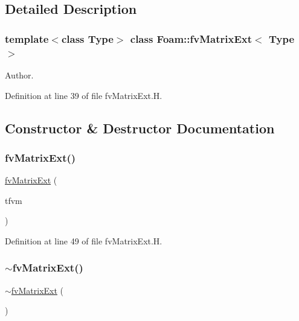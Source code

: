\subsection{Detailed Description}
\subsubsection*{template$<$class Type$>$\newline
class Foam\+::fv\+Matrix\+Ext$<$ Type $>$}

Author. 

\label{_Description}%
 

Definition at line 39 of file fv\+Matrix\+Ext.\+H.



\subsection{Constructor \& Destructor Documentation}
\mbox{\label{classFoam_1_1fvMatrixExt_a5553b6a9b6f40731de6b5b41c97d3697}} 
\subsubsection{\texorpdfstring{fv\+Matrix\+Ext()}{fvMatrixExt()}}
{\footnotesize\ttfamily \hyperlink{classFoam_1_1fvMatrixExt}{fv\+Matrix\+Ext} (\begin{DoxyParamCaption}\item[{const tmp$<$ fv\+Matrix$<$ Type $>$ $>$ \&}]{tfvm }\end{DoxyParamCaption})\hspace{0.3cm}{\ttfamily [inline]}}



Definition at line 49 of file fv\+Matrix\+Ext.\+H.

\mbox{\label{classFoam_1_1fvMatrixExt_af9ead4a5f5f86d06dd03436fc3460dfa}} 
\subsubsection{\texorpdfstring{$\sim$fv\+Matrix\+Ext()}{~fvMatrixExt()}}
{\footnotesize\ttfamily $\sim$\hyperlink{classFoam_1_1fvMatrixExt}{fv\+Matrix\+Ext} (\begin{DoxyParamCaption}{ }\end{DoxyParamCaption})\hspace{0.3cm}{\ttfamily [inline]}}



